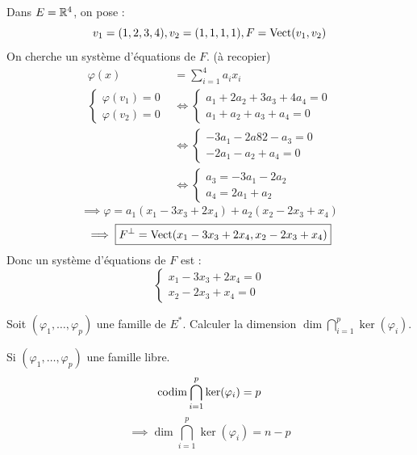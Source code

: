 \documentclass[11pt,a4paper]{report}
\begin{document}
\begin{example}
    Dans $E = \mathbb{R}^4$, on pose :
    $$v_1 = (1,2,3,4), v_2 = (1,1,1,1), F = \mathrm{Vect}(v_1, v_2)$$
    On cherche un système d'équations de $F$.
    (à recopier)
    \begin{align*}
        \varphi(x) &= \sum_{i=1}^4 a_i x_i \\
        \begin{cases} \varphi(v_1) = 0 \\ \varphi(v_2) = 0 \end{cases} &\iff \begin{cases}
        a_1 + 2a_2 + 3a_3 + 4a_4 = 0 \\
        a_1 + a_2 + a_3 + a_4 = 0
        \end{cases} \\
        &\iff \begin{cases} 
        -3a_1-2a82 - a_3 = 0 \\
        -2a_1-a_2 + a_4 = 0
        \end{cases}
        \\
        &\iff \begin{cases}
            a_3 = -3a_1 - 2a_2 \\
            a_4 = 2a_1 + a_2
        \end{cases}
    \end{align*}
    $$\implies \varphi = a_1(x_1 - 3x_3 + 2x_4) + a_2(x_2 - 2x_3 + x_4)$$
    $$\implies \boxed{F^\perp = \mathrm{Vect}(x_1 - 3x_3 + 2x_4, x_2 - 2x_3 + x_4)}$$
    Donc un système d'équations de $F$ est :
    $$\begin{cases}
        x_1 - 3x_3 + 2x_4 = 0 \\
        x_2 - 2x_3 + x_4 = 0
    \end{cases}$$
\end{example}
\todo

\begin{exercise}
    Soit $(\varphi_1,\dots,\varphi_p)$ une famille de $E^*$. Calculer la dimension $\dim \bigcap_{i=1}^p \ker(\varphi_i)$.
\end{exercise}

\begin{rappel}
    Si $(\varphi_1,\dots,\varphi_p)$ une famille libre.
    $$\mathrm{codim} \bigcap_{i=1}^p \ker(\varphi_i) = p$$
    $$\implies \dim \bigcap_{i=1}^p \ker(\varphi_i) = n - p$$
\end{rappel}
\todo
\end{document}
